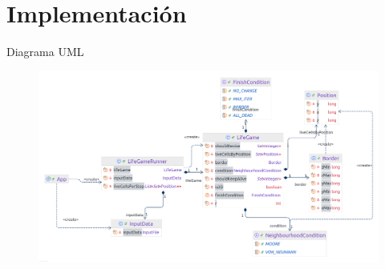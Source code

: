 \section{Implementación}
\begin{frame}{Diagrama UML}
    \begin{figure}[H]
        \centering
        \includegraphics[width=0.9\linewidth]{pic/03-implementacion/UML}
    \end{figure}
\end{frame}

